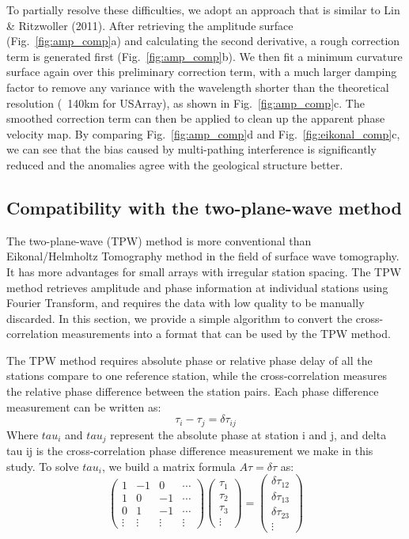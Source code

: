 \documentclass[referee]{gji}
\begin{document}
To partially resolve these difficulties, we adopt an approach that is similar to Lin \& Ritzwoller (2011). After retrieving the amplitude surface (Fig.~\ref{fig:amp_comp}a) and calculating the second derivative, a rough correction term is generated first (Fig.~\ref{fig:amp_comp}b). We then fit a minimum curvature surface again over this preliminary correction term, with a much larger damping factor to remove any variance with the wavelength shorter than the theoretical resolution (~140km for USArray), as shown in Fig.~\ref{fig:amp_comp}c. The smoothed correction term can then be applied to clean up the apparent phase velocity map. By comparing Fig.~\ref{fig:amp_comp}d and Fig.~\ref{fig:eikonal_comp}c, we can see that the bias caused by multi-pathing interference is significantly reduced and the anomalies agree with the geological structure better. 

\subsection{Compatibility with the two-plane-wave method}
The two-plane-wave (TPW) method \cite{Forsyth:2005aa} is more conventional than Eikonal/Helmholtz Tomography method \cite{Lin:2009fx,Lin:2011fw} in the field of surface wave tomography. It has more advantages for small arrays with irregular station spacing.  The TPW method retrieves amplitude and phase information at individual stations using Fourier Transform, and requires the data with low quality to be manually discarded.  In this section, we provide a simple algorithm to convert the cross-correlation measurements into a format that can be used by the TPW method.

The TPW method requires absolute phase or relative phase delay of all the stations compare to one reference station, while the cross-correlation measures the relative phase difference between the station pairs. Each phase difference measurement can be written as:
\[
\tau_i - \tau_j = \delta \tau_{ij}
\]
Where $tau_i$ and $tau_j$ represent the absolute phase at station i and j, and delta tau ij is the cross-correlation phase difference measurement we make in this study. To solve $tau_i$, we build a matrix formula $A\tau = \delta\tau$ as:
\[ 
\left( \begin{array}{cccc}
1 & -1 & 0 & \cdots \\
1 & 0 & -1 & \cdots \\
0 & 1 & -1 & \cdots \\
\vdots &\vdots &\vdots & \vdots
\end{array} \right)
\left( \begin{array}{c}
	\tau_1 \\ 
	\tau_2 \\
	\tau_3 \\
	\vdots
\end{array} \right) = 
\left( \begin{array}{c}
	\delta \tau_{12} \\ 
	\delta \tau_{13} \\
	\delta \tau_{23} \\
	\vdots
\end{array} \right)  
\] 
\end{document}
